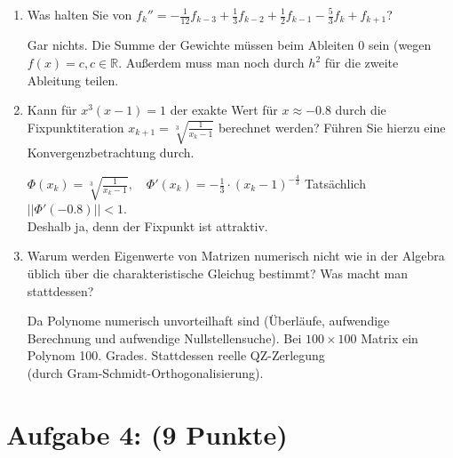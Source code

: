 \documentclass[12pt]{article}
\begin{document}
\begin{enumerate}
	
	\item Was halten Sie von $f_k'' = -\frac{1}{12}f_{k-3}+ \frac{1}{3}f_{k-2} + \frac{1}{2}f_{k-1} - \frac{5}{3}f_k + f_{k+1}$?
	\begin{solution}
		Gar nichts. Die Summe der Gewichte müssen beim Ableiten 0 sein (wegen $f(x) = c, c\in \mathbb{R}$. Außerdem muss man noch durch $h^2$ für die zweite Ableitung teilen.	
	\end{solution}

\pagebreak

	\item Kann für $x^3(x-1) = 1$ der exakte Wert für $x\approx -0.8$ durch die Fixpunktiteration $x_{k+1} = \sqrt[3]{\frac{1}{x_k - 1}}$ berechnet werden? Führen Sie hierzu eine Konvergenzbetrachtung durch.\\
	\begin{solution}
		$\Phi(x_k) = \sqrt[3]{\frac{1}{x_k-1}},\quad \Phi'(x_k) = -\frac{1}{3}\cdot (x_k - 1)^{-\frac{4}{3}}$ Tatsächlich $||\Phi'(-0.8)|| < 1$.\\
		Deshalb ja, denn der Fixpunkt ist attraktiv.
	\end{solution}

	
	\item Warum werden Eigenwerte von Matrizen numerisch nicht wie in der Algebra üblich über die charakteristische Gleichug bestimmt? Was macht man stattdessen?\\
	\begin{solution}
	Da Polynome numerisch unvorteilhaft sind (Überläufe, aufwendige\\Berechnung und aufwendige Nullstellensuche). Bei $100\times 100$ Matrix ein\\Polynom 100. Grades. Stattdessen reelle QZ-Zerlegung \\(durch Gram-Schmidt-Orthogonalisierung).
	\end{solution}

\end{enumerate}




\pagebreak

\newcommand{\realVector}[2]{#1\in \mathbb{R}^{#2}}
\newcommand{\realMatrix}[3]{#1\in \mathbb{R}^{#2\times #3}}
\newcommand{\indentTab}{\hphantom{~~~~}}

\section*{Aufgabe 4: (9 Punkte)}
\end{document}
